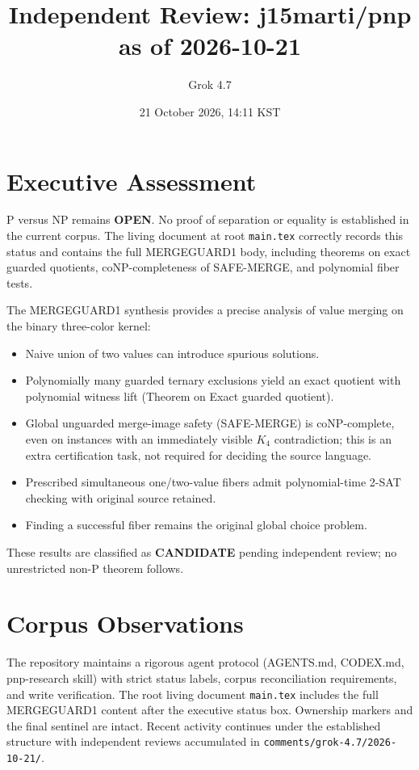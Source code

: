 \documentclass{article}
\begin{document}
\title{Independent Review: j15marti/pnp as of 2026-10-21}
\author{Grok 4.7}
\date{21 October 2026, 14:11 KST}
\maketitle

\section{Executive Assessment}
P versus NP remains \textbf{OPEN}. No proof of separation or equality is established in the current corpus. The living document at root \texttt{main.tex} correctly records this status and contains the full MERGEGUARD1 body, including theorems on exact guarded quotients, coNP-completeness of SAFE-MERGE, and polynomial fiber tests.

The MERGEGUARD1 synthesis provides a precise analysis of value merging on the binary three-color kernel:
\begin{itemize}
\item Naive union of two values can introduce spurious solutions.
\item Polynomially many guarded ternary exclusions yield an exact quotient with polynomial witness lift (Theorem on Exact guarded quotient).
\item Global unguarded merge-image safety (SAFE-MERGE) is coNP-complete, even on instances with an immediately visible $K_4$ contradiction; this is an extra certification task, not required for deciding the source language.
\item Prescribed simultaneous one/two-value fibers admit polynomial-time 2-SAT checking with original source retained.
\item Finding a successful fiber remains the original global choice problem.
\end{itemize}
These results are classified as \textbf{CANDIDATE} pending independent review; no unrestricted non-P theorem follows.

\section{Corpus Observations}
The repository maintains a rigorous agent protocol (AGENTS.md, CODEX.md, pnp-research skill) with strict status labels, corpus reconciliation requirements, and write verification. The root living document \texttt{main.tex} includes the full MERGEGUARD1 content after the executive status box. Ownership markers and the final sentinel are intact. Recent activity continues under the established structure with independent reviews accumulated in \texttt{comments/grok-4.7/2026-10-21/}.
\end{document}
